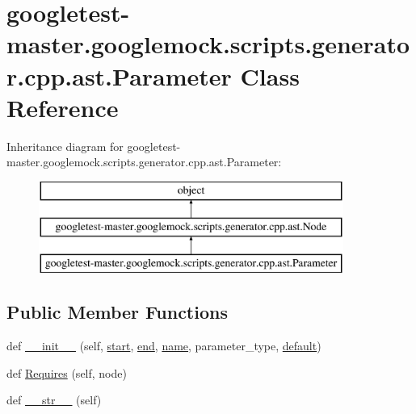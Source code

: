 \hypertarget{classgoogletest-master_1_1googlemock_1_1scripts_1_1generator_1_1cpp_1_1ast_1_1_parameter}{}\section{googletest-\/master.googlemock.\+scripts.\+generator.\+cpp.\+ast.\+Parameter Class Reference}
\label{classgoogletest-master_1_1googlemock_1_1scripts_1_1generator_1_1cpp_1_1ast_1_1_parameter}
Inheritance diagram for googletest-\/master.googlemock.\+scripts.\+generator.\+cpp.\+ast.\+Parameter\+:\begin{figure}[H]
\begin{center}
\leavevmode
\includegraphics[height=3.000000cm]{db/d08/classgoogletest-master_1_1googlemock_1_1scripts_1_1generator_1_1cpp_1_1ast_1_1_parameter}
\end{center}
\end{figure}
\subsection*{Public Member Functions}
\begin{DoxyCompactItemize}
\item 
def \mbox{\hyperlink{classgoogletest-master_1_1googlemock_1_1scripts_1_1generator_1_1cpp_1_1ast_1_1_parameter_aa1d5265408bf9ea562bf1656e99f00a2}{\+\_\+\+\_\+init\+\_\+\+\_\+}} (self, \mbox{\hyperlink{classgoogletest-master_1_1googlemock_1_1scripts_1_1generator_1_1cpp_1_1ast_1_1_node_a6f9eb279a989f9ca27e7d0f1975336d1}{start}}, \mbox{\hyperlink{classgoogletest-master_1_1googlemock_1_1scripts_1_1generator_1_1cpp_1_1ast_1_1_node_a747e90ade89c1764e83b5b649bde18cc}{end}}, \mbox{\hyperlink{classgoogletest-master_1_1googlemock_1_1scripts_1_1generator_1_1cpp_1_1ast_1_1_parameter_a4e76546ea0517958e0785aaa82e614b1}{name}}, parameter\+\_\+type, \mbox{\hyperlink{classgoogletest-master_1_1googlemock_1_1scripts_1_1generator_1_1cpp_1_1ast_1_1_parameter_af87cdd262b0b943556024df7cc655b74}{default}})
\item 
def \mbox{\hyperlink{classgoogletest-master_1_1googlemock_1_1scripts_1_1generator_1_1cpp_1_1ast_1_1_parameter_aad10544558d5150e4a3e11fc537b810e}{Requires}} (self, node)
\item 
def \mbox{\hyperlink{classgoogletest-master_1_1googlemock_1_1scripts_1_1generator_1_1cpp_1_1ast_1_1_parameter_a1cf9ea65560c05824ff5e4ca37f673c6}{\+\_\+\+\_\+str\+\_\+\+\_\+}} (self)
\end{DoxyCompactItemize}
